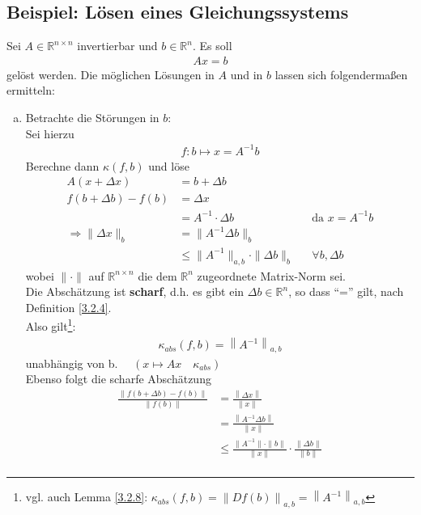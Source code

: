 \documentclass[ngerman,fontsize=11pt, paper=a4, parskip=half, titlepage=true, toc=bib]{scrbook}
\newcommand{\R}{\mathds{R}}
\newcommand{\Ren}{\mathds{R}^{n}}
\newcommand{\Renn}{\mathds{R}^{n\times n}}
\newcommand{\nn}[1]{\left\| #1 \right\|}
\begin{document}
\subsection{Beispiel: Lösen eines Gleichungssystems} \label{3.2.10}
Sei $A\in \R^{n\times n}$ invertierbar und $b\in \R^n$. Es soll 
\begin{gather*}
	Ax =b
\end{gather*}
gelöst werden.
Die möglichen Lösungen in $A$ und in $b$ lassen sich folgendermaßen ermitteln:
\begin{enumerate}[a)]
	\item Betrachte die Störungen in $b$:\\
			Sei hierzu
			\begin{gather*}
			f: b\mapsto x= A^{-1}b 
			\end{gather*}
			Berechne dann $ \kappa(f,b)$ und löse 
			\begin{align*}
					A(x + \Delta x) &= b+\Delta b \\
					f(b + \Delta b) - f(b) &= \Delta x \\
													&= A^{-1} \cdot \Delta b && \text{da }x = A^{-1}b \\
					\Rightarrow \|\Delta x\|_{b}  &= \|A^{-1}\Delta b\|_{b} \\
														&\leq \|A^{-1}\|_{a,b}\cdot \|\Delta b\|_{b} && \forall b, \Delta b 
			\end{align*}
			wobei $\|\cdot\| $ auf $\Renn$ die dem $\Ren$ zugeordnete Matrix-Norm sei. \\
			Die Abschätzung ist \textbf{scharf}, d.h. es gibt ein $\Delta b\in \R^n$, so dass \enquote{=} gilt, nach Definition \ref{3.2.4}. \\
			Also gilt\footnote{vgl. auch Lemma \ref{3.2.8}: $\kappa_{abs}(f,b)=\nn{Df(b)}_{a,b}=\nn{A^{-1}}_{a,b}$}:
			\begin{gather}
				\kappa_{abs}(f,b) = \nn{A^{-1}}_{a,b} \label{III.2.6}
			\end{gather}
			unabhängig von b.  $ \quad \left( x\mapsto Ax \quad \kappa_{abs}\right)$\\
			Ebenso folgt die scharfe Abschätzung 
			\begin{align}
				\nonumber
				\frac{\|	f(b + \Delta b) - f(b)\|}{\|f(b)\|} &= \frac{\nn{\Delta x}}{\nn{x}}\\ \nonumber
						& = \frac{\nn{A^{-1}\Delta b}}{\nn{x}} \\ \nonumber
						& \leq  \frac{\|A^{-1}\|\cdot \|b\|}{\|x\|} \cdot \frac{\|\Delta b\|}{\|b\|} \\

\end{align}
\end{enumerate}
\end{document}
